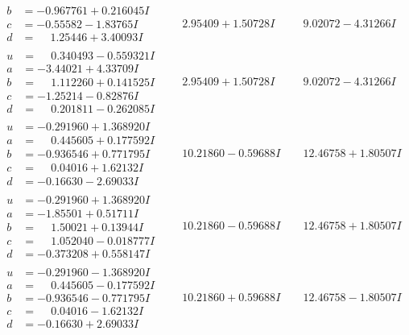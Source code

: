 \documentclass[1p]{elsarticle_modified}
\theoremstyle{definition}
\begin{document}
$$\begin{array}{c|c|c}
\begin{aligned}
b &= -0.967761 + 0.216045 I \\
c &= -0.55582 - 1.83765 I \\
d &= \phantom{-}1.25446 + 3.40093 I\end{aligned}
 & \phantom{-}2.95409 + 1.50728 I & \phantom{-}9.02072 - 4.31266 I \\ \hline\begin{aligned}
u &= \phantom{-}0.340493 - 0.559321 I \\
a &= -3.44021 + 4.33709 I \\
b &= \phantom{-}1.112260 + 0.141525 I \\
c &= -1.25214 - 0.82876 I \\
d &= \phantom{-}0.201811 - 0.262085 I\end{aligned}
 & \phantom{-}2.95409 + 1.50728 I & \phantom{-}9.02072 - 4.31266 I \\ \hline\begin{aligned}
u &= -0.291960 + 1.368920 I \\
a &= \phantom{-}0.445605 + 0.177592 I \\
b &= -0.936546 + 0.771795 I \\
c &= \phantom{-}0.04016 + 1.62132 I \\
d &= -0.16630 - 2.69033 I\end{aligned}
 & \phantom{-}10.21860 - 0.59688 I & \phantom{-}12.46758 + 1.80507 I \\ \hline\begin{aligned}
u &= -0.291960 + 1.368920 I \\
a &= -1.85501 + 0.51711 I \\
b &= \phantom{-}1.50021 + 0.13944 I \\
c &= \phantom{-}1.052040 - 0.018777 I \\
d &= -0.373208 + 0.558147 I\end{aligned}
 & \phantom{-}10.21860 - 0.59688 I & \phantom{-}12.46758 + 1.80507 I \\ \hline\begin{aligned}
u &= -0.291960 - 1.368920 I \\
a &= \phantom{-}0.445605 - 0.177592 I \\
b &= -0.936546 - 0.771795 I \\
c &= \phantom{-}0.04016 - 1.62132 I \\
d &= -0.16630 + 2.69033 I\end{aligned}
 & \phantom{-}10.21860 + 0.59688 I & \phantom{-}12.46758 - 1.80507 I \\ \hline\begin{aligned}

\end{aligned}
\end{array}$$
\end{document}
